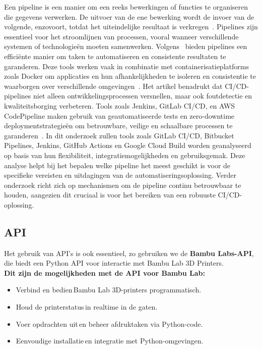Een pipeline is een manier om een reeks bewerkingen of functies te organiseren die gegevens verwerken. De uitvoer van de ene bewerking wordt de invoer van de volgende, enzovoort, totdat het uiteindelijke resultaat is verkregen~\autocite{pythonPipelinesThakur}. Pipelines zijn essentieel voor het stroomlijnen van processen, vooral wanneer verschillende systemen of technologieën moeten samenwerken. Volgens~\autocite{thesusVirtanen} bieden pipelines een efficiënte manier om taken te automatiseren en consistente resultaten te garanderen. Deze tools werken vaak in combinatie met containerisatieplatforms zoals Docker om applicaties en hun afhankelijkheden te isoleren en consistentie te waarborgen over verschillende omgevingen~\autocite{ijrasetCICDPipeline}. Het artikel benadrukt dat CI/CD-pipelines niet alleen ontwikkelingsprocessen versnellen, maar ook foutdetectie en kwaliteitsborging verbeteren. Tools zoals Jenkins, GitLab CI/CD, en AWS CodePipeline maken gebruik van geautomatiseerde tests en zero-downtime deploymentstrategieën om betrouwbare, veilige en schaalbare processen te garanderen~\autocite{ijrasetCICDPipeline}. In dit onderzoek zullen tools zoals GitLab CI/CD, Bitbucket Pipelines, Jenkins, GitHub Actions en Google Cloud Build worden geanalyseerd op basis van hun flexibiliteit, integratiemogelijkheden en gebruiksgemak. Deze analyse helpt bij het bepalen welke pipeline het meest geschikt is voor de specifieke vereisten en uitdagingen van de automatiseringsoplossing. Verder onderzoek richt zich op mechanismen om de pipeline continu betrouwbaar te houden, aangezien dit cruciaal is voor het bereiken van een robuuste CI/CD-oplossing.

\subsection{API}%

Het gebruik van API’s is ook essentieel, zo gebruiken we de \textbf{Bambu Labs-API}, die biedt een Python API voor interactie met Bambu Lab 3D Printers.\\

\textbf{Dit zijn de mogelijkheden met de API voor Bambu Lab:}

\begin{itemize}
\item Verbind en bedien Bambu Lab 3D-printers programmatisch. 
\item Houd de printerstatus in realtime in de gaten. 
\item Voer opdrachten uit en beheer afdruktaken via Python-code. 
\item Eenvoudige installatie en integratie met Python\--omgevingen. 
\end{itemize}

